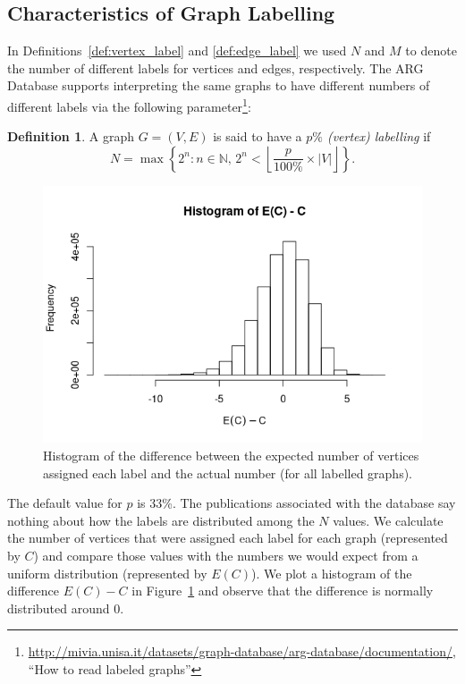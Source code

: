 \documentclass{l4proj}
\theoremstyle{definition}
\newtheorem{definition}{Definition}[chapter]
\theoremstyle{remark}
\begin{document}
\subsection{Characteristics of Graph Labelling} \label{sec:characteristics}

In Definitions~\ref{def:vertex_label} and \ref{def:edge_label} we used $N$ and
$M$ to denote the number of different labels for vertices and edges,
respectively. The ARG Database supports interpreting the same graphs to have
different numbers of different labels via the following
parameter\footnote{\url{http://mivia.unisa.it/datasets/graph-database/arg-database/documentation/},
``How to read labeled graphs''}:

\begin{definition} \label{def:percent_labelling}
  A graph $G = (V, E)$ is said to have a \emph{$p\%$ (vertex) labelling} if
  \[ N = \max \left\{ 2^n : n \in \mathbb{N},\, 2^n < \left\lfloor \frac{p}{100\%}
        \times |V| \right\rfloor \right\}. \]
\end{definition}

\begin{figure}
  \centering
  \includegraphics[scale=0.5]{images/labelling_histogram.png}
  \caption{Histogram of the difference between the expected number of vertices
    assigned each label and the actual number (for all labelled graphs).}
  \label{figure:labelling_histogram}
\end{figure}

The default value for $p$ is 33\%. The publications associated with the database
\cite{foggia2001-2, DBLP:journals/prl/SantoFSV03} say nothing about how the
labels are distributed among the $N$ values. We calculate the number of vertices
that were assigned each label for each graph (represented by $C$) and compare
those values with the numbers we would expect from a uniform distribution
(represented by $E(C)$). We plot a histogram of the difference $E(C) - C$ in
Figure~\ref{figure:labelling_histogram} and observe that the difference is
normally distributed around 0.
\end{document}
